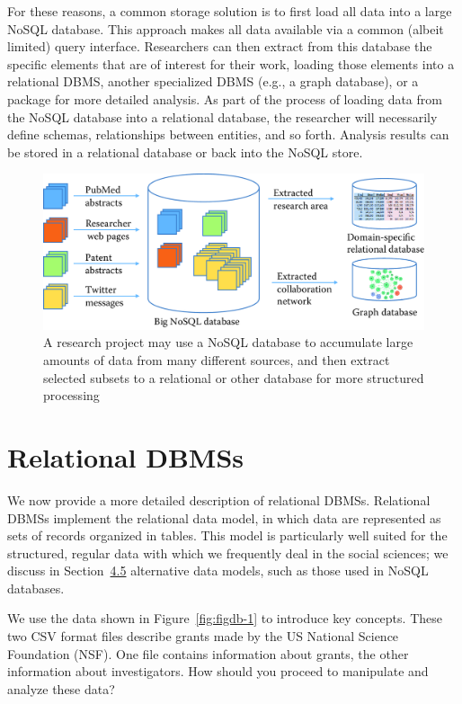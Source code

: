 \documentclass[]{krantz}
\begin{document}
\enlargethispage{-12pt} For these reasons, a common storage solution is
to first load all data into a large NoSQL database. This approach makes
all data available via a common (albeit limited) query interface.
Researchers can then extract from this database the specific elements
that are of interest for their work, loading those elements into a
relational DBMS, another specialized DBMS (e.g., a graph database), or a
package for more detailed analysis. As part of the process of loading
data from the NoSQL database into a relational database, the researcher
will necessarily define schemas, relationships between entities, and so
forth. Analysis results can be stored in a relational database or back
into the NoSQL store.

\begin{figure}

{\centering \includegraphics[width=0.7\linewidth]{ChapterDB/figures/data-fig2} 

}

\caption{A research project may use a NoSQL database to accumulate large amounts of data from many different sources, and then extract selected subsets to a relational or other database for more structured processing}\label{fig:figdb-dbs}
\end{figure}

\section{Relational DBMSs}\label{relational-dbmss}

We now provide a more detailed description of relational DBMSs.
Relational DBMSs implement the relational data model, in which data are
represented as sets of records organized in tables. This model is
particularly well suited for the structured, regular data with which we
frequently deal in the social sciences; we discuss in
Section~\protect\hyperlink{sec:db:nosql}{4.5} alternative data models,
such as those used in NoSQL databases.

We use the data shown in Figure~\ref{fig:figdb-1} to introduce key
concepts. These two CSV format files describe grants made by the US
National Science Foundation (NSF). One file contains information about
grants, the other information about investigators. How should you
proceed to manipulate and analyze these data?
\end{document}
